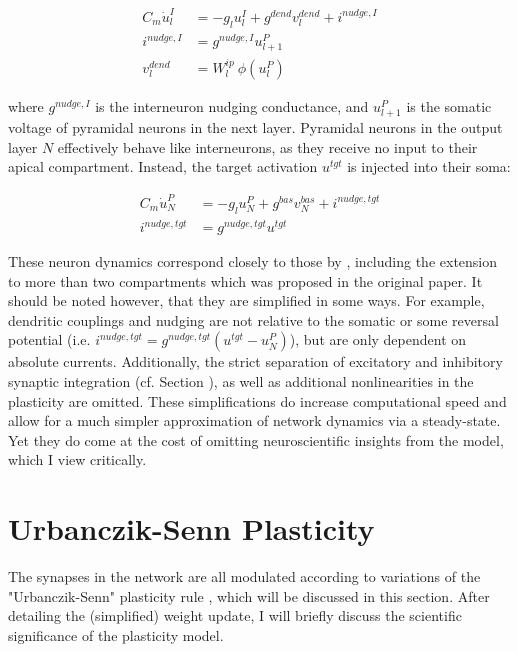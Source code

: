 \begin{align}
  C_m \dot{u}_l^I & = - g_l u_l^{I} + g^{dend} v_l^{dend} + i^{nudge, I}\label{eq-intn-dynamics} \\
  i^{nudge, I}    & = g^{nudge, I} u_{l+1}^P                                                     \\
  v_l^{dend}      & = W_l^{ip} \ \phi(u_{l}^P)
\end{align}

where $ g^{nudge, I}$ is the interneuron nudging conductance, and $u_{l+1}^P$ is the somatic voltage of pyramidal
neurons in the next layer.  Pyramidal neurons in the output layer $N$ effectively behave like interneurons, as they
receive no input to their apical compartment. Instead, the target  activation $u^{tgt}$ is injected into their soma:

\begin{align}
  C_m \dot{u}_N^P & = - g_l u_N^{P} + g^{bas} v_N^{bas} + i^{nudge, tgt} \\
  i^{nudge, tgt}  & = g^{nudge, tgt} u^{tgt}
\end{align}


These neuron dynamics correspond closely to those by \cite{urbanczik2014learning}, including the extension to more than
two compartments which was proposed in the original paper. It should be noted however, that they are simplified in some
 ways. For example, dendritic couplings and nudging are not relative to the somatic or some reversal potential (i.e.
$i^{nudge, tgt}= g^{nudge, tgt} (u^{tgt} - u_N^P )$), but are only dependent on absolute currents. Additionally, the 
strict separation of excitatory and inhibitory synaptic integration (cf. Section ), as well as additional nonlinearities in the 
plasticity are omitted.  These simplifications do increase computational speed and allow for a much simpler approximation
of network dynamics via a steady-state. Yet they do come at the cost of omitting neuroscientific insights from the model,
which I view critically. \phrasing




\section{Urbanczik-Senn Plasticity}\label{sec-urb-senn-plast}

The synapses in the network are all modulated according to variations of the "Urbanczik-Senn" plasticity rule
\citep{urbanczik2014learning}, which will be discussed in this section. After detailing the (simplified) weight update,
I will briefly discuss the scientific significance of the plasticity model.

